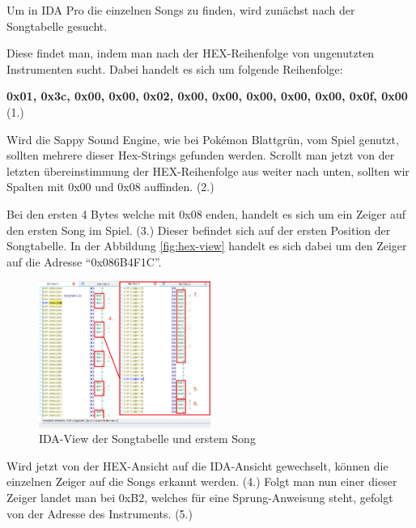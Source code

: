 \documentclass[11pt,a4paper]{scrartcl}
\begin{document}
Um in IDA Pro die einzelnen Songs zu finden, wird zun\"achst nach der Songtabelle gesucht.

Diese findet man, indem man nach der HEX-Reihenfolge von ungenutzten Instrumenten sucht. Dabei handelt es sich um folgende Reihenfolge: 

\textbf{0x01, 0x3c, 0x00, 0x00, 0x02, 0x00, 0x00, 0x00, 0x00, 0x00, 0x0f, 0x00} (1.)

Wird die Sappy Sound Engine, wie bei Pok\'{e}mon Blattgr\"un, vom Spiel genutzt, sollten mehrere dieser Hex-Strings gefunden werden.
Scrollt man jetzt von der letzten \"ubereinstimmung der HEX-Reihenfolge aus weiter nach unten, sollten wir Spalten mit 0x00 und 0x08 auffinden. (2.)

Bei den ersten 4 Bytes welche mit 0x08 enden, handelt es sich um ein Zeiger auf den ersten Song im Spiel. (3.) Dieser befindet sich auf der ersten Position der Songtabelle. 
In der Abbildung \ref{fig:hex-view} handelt es sich dabei um den Zeiger auf die Adresse "`0x086B4F1C"'.

\vspace{15pt}

\begin{figure}
	\vspace{-10pt}
	\begin{center}
		\includegraphics[width=0.5\textwidth]{SongtabellenHeader}
	\end{center}
	\vspace{-10pt}
	\caption{IDA-View der Songtabelle und erstem Song}
	\label{fig:IDA-view}
	\vspace{-40pt}
\end{figure}


Wird jetzt von der HEX-Ansicht auf die IDA-Ansicht gewechselt, k\"onnen die einzelnen Zeiger auf die Songs erkannt werden. (4.)
Folgt man nun einer dieser Zeiger landet man bei 0xB2, welches f\"ur eine Sprung-Anweisung steht, gefolgt von der Adresse des Instruments. (5.)
\end{document}
